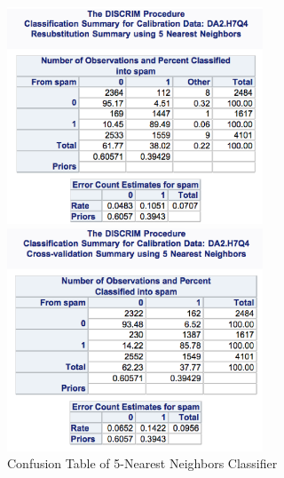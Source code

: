 \documentclass[letterpaper, 12pt]{article}
\begin{document}
\begin{figure}[htbp]
\begin{minipage}[t]{0.5\linewidth}
\centering
\includegraphics[width=3in]{7-19.eps}
\end{minipage}
\begin{minipage}[t]{0.5\linewidth}
\centering
\includegraphics[width=3in]{7-20.eps}
\end{minipage}
\caption{Confusion Table of 5-Nearest Neighbors Classifier}\label{t3}
\end{figure}
\end{document}
